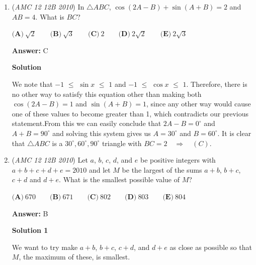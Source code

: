 \begin{enumerate}
 \[\log_2x = 8\]

 \[x = 256 \;\; (D)\]




\textbf{Solution 2}

Using the fact that $\log_{x^n}{y^n} = \log_{x}{y}$, we see that the equation becomes $\log_{2}{x} + \log_{2}{x} + \log_{2}{x} + \log_{2}{x} + \log_{2}{x} = 40$. Thus, $5\log_{2}{x} = 40$ and $\log_{2}{x} = 8$, so $x = 2^8 = 256$, or $\boxed{(D)}$.

 


 


	\item (\textit{AMC 12 12B 2010}) In $\triangle ABC$, $\cos(2A-B)+\sin(A+B)=2$ and $AB=4$. What is $BC$?


 $\textbf{(A)}\ \sqrt{2} \qquad \textbf{(B)}\ \sqrt{3} \qquad \textbf{(C)}\ 2 \qquad \textbf{(D)}\ 2\sqrt{2} \qquad \textbf{(E)}\ 2\sqrt{3}$

 \textbf{Answer: }C



\textbf{Solution}

We note that $-1$ $\le$ $\sin x$ $\le$ $1$ and $-1$ $\le$ $\cos x$ $\le$ $1$. Therefore, there is no other way to satisfy this equation other than making both $\cos(2A-B)=1$ and $\sin(A+B)=1$, since any other way would cause one of these values to become greater than 1, which contradicts our previous statement.From this we can easily conclude that $2A-B=0^{\circ}$ and $A+B=90^{\circ}$ and solving this system gives us $A=30^{\circ}$ and $B=60^{\circ}$. It is clear that $\triangle ABC$ is a $30^{\circ},60^{\circ},90^{\circ}$ triangle with $BC=2$　$\Longrightarrow$　$(C)$.

 


	\item (\textit{AMC 12 12B 2010}) Let $a$, $b$, $c$, $d$, and $e$ be positive integers with $a+b+c+d+e=2010$ and let $M$ be the largest of the sums $a+b$, $b+c$, $c+d$ and $d+e$. What is the smallest possible value of $M$?


 $\textbf{(A)}\ 670 \qquad \textbf{(B)}\ 671 \qquad \textbf{(C)}\ 802 \qquad \textbf{(D)}\ 803 \qquad \textbf{(E)}\ 804$

 \textbf{Answer: }B



\textbf{Solution 1}

We want to try make $a+b$, $b+c$, $c+d$, and $d+e$ as close as possible so that $M$, the maximum of these, is smallest.


\end{enumerate}
